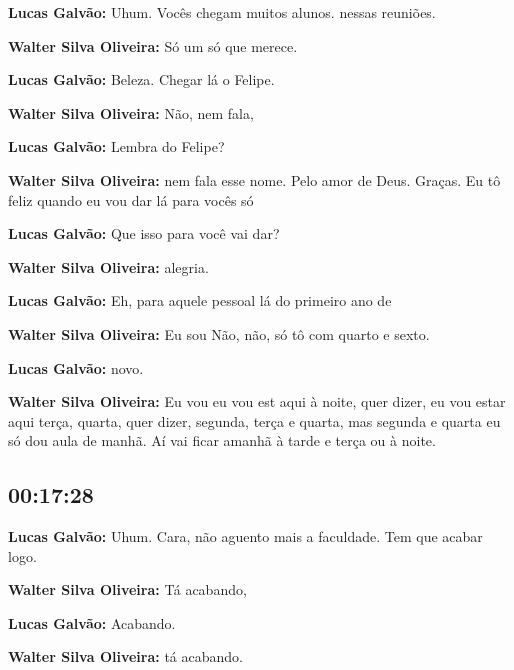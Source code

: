 \textbf{Lucas Galvão:} Uhum. Vocês chegam muitos alunos. nessas reuniões.



\textbf{Walter Silva Oliveira:} Só um só que merece.



\textbf{Lucas Galvão:} Beleza. Chegar lá o Felipe.



\textbf{Walter Silva Oliveira:} Não, nem fala,



\textbf{Lucas Galvão:} Lembra do Felipe?



\textbf{Walter Silva Oliveira:} nem fala esse nome. Pelo amor de Deus. Graças. Eu tô feliz quando eu vou dar lá para vocês só



\textbf{Lucas Galvão:} Que isso para você vai dar?



\textbf{Walter Silva Oliveira:} alegria.



\textbf{Lucas Galvão:} Eh, para aquele pessoal lá do primeiro ano de



\textbf{Walter Silva Oliveira:} Eu sou Não, não, só tô com quarto e sexto.



\textbf{Lucas Galvão:} novo.



\textbf{Walter Silva Oliveira:} Eu vou eu vou est aqui à noite, quer dizer, eu vou estar aqui terça, quarta, quer dizer, segunda, terça e quarta, mas segunda e quarta eu só dou aula de manhã. Aí vai ficar amanhã à tarde e terça ou à noite.



\subsection{\textbf{00:17:28}}



\textbf{Lucas Galvão:} Uhum. Cara, não aguento mais a faculdade. Tem que acabar logo.



\textbf{Walter Silva Oliveira:} Tá acabando,



\textbf{Lucas Galvão:} Acabando.



\textbf{Walter Silva Oliveira:} tá acabando.




